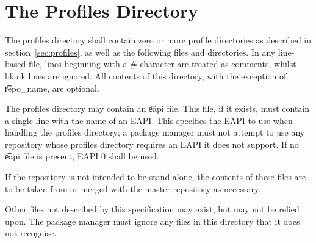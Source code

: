 \section{The Profiles Directory}
\label{sec:profiles-dir}

The profiles directory shall contain zero or more profile directories
as described in section~\ref{sec:profiles}, as well as the following files
and directories. In any line-based file, lines beginning with a \#
character are treated as comments, whilst blank lines are ignored. All
contents of this directory, with the exception of \t{repo_name}, are
optional.

The profiles directory may contain an \t{eapi} file. This file, if it exists, must contain a single
line with the name of an EAPI\@. This specifies the EAPI to use when handling the profiles
directory; a package manager must not attempt to use any repository whose profiles directory
requires an EAPI it does not support. If no \t{eapi} file is present, EAPI 0 shall be used.

If the repository is not intended to be stand-alone, the contents of these files are to be taken
from or merged with the master repository as necessary.

Other files not described by this specification may exist, but may not be relied upon. The package
manager must ignore any files in this directory that it does not recognise.

